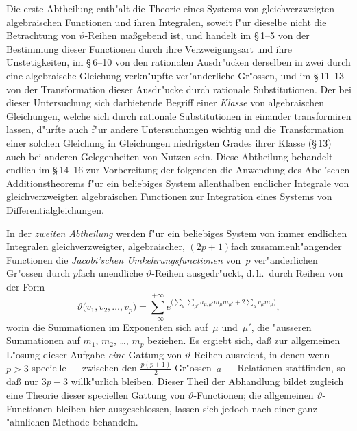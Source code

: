 \documentclass[12pt,a4paper]{book}
\theoremstyle{definition}
\theoremstyle{remark}
\begin{document}
Die erste Abtheilung enth"alt die Theorie eines Systems von
gleichverzweigten algebraischen Functionen und ihren Integralen, soweit
f"ur dieselbe nicht die Betrachtung von $\vartheta$-Reihen ma\ss{}gebend ist, und
handelt im \S\,1--5 von der Bestimmung dieser Functionen durch ihre
Verzweigungsart und ihre Unstetigkeiten, im \S\,6--10 von den rationalen
Ausdr"ucken derselben in zwei durch eine algebraische Gleichung verkn"upfte
ver"anderliche Gr"ossen, und im \S\,11--13 von der Transformation dieser
Ausdr"ucke durch rationale Substitutionen. Der bei dieser Untersuchung
sich darbietende Begriff einer \emph{Klasse} von algebraischen Gleichungen,
welche sich durch rationale Substitutionen in einander transformiren lassen,
d"urfte auch f"ur andere Untersuchungen wichtig und die Transformation
einer solchen Gleichung in Gleichungen niedrigsten Grades ihrer Klasse
(\S\,13) auch bei anderen Gelegenheiten von Nutzen sein. Diese Abtheilung
behandelt endlich im \S\,14--16 zur Vorbereitung der folgenden die
Anwendung des Abel'schen Additionstheorems f"ur ein beliebiges System
allenthalben endlicher Integrale von gleichverzweigten algebraischen
Functionen zur Integration eines Systems von Differentialgleichungen.

In der \emph{zweiten Abtheilung} werden f"ur ein beliebiges System von
immer endlichen Integralen gleichverzweigter, algebraischer, $(2p+1)$fach
zusammenh"angender Functionen die \emph{Jacobi'schen Umkehrungsfunctionen}
von~$p$ ver"anderlichen Gr"ossen durch $p$fach unendliche $\vartheta$-Reihen
ausgedr"uckt, d.\,h.\ durch Reihen von der Form
\[
\vartheta\bigl(v_1, v_2, \ldots, v_p\bigr) =
\sum_{-\infty}^{+\infty} e^{\bigl(\sum_{\mu} \sum_{\mu'}
  a_{\mu,\mu'} m_\mu m_{\mu'} + 2\sum_\mu v_\mu m_\mu\bigr)}\!,
\]
worin die Summationen im Exponenten sich auf~$\mu$ und~$\mu'$, die "ausseren
Summationen auf $m_1$, $m_2$, \ldots, $m_p$ beziehen. Es ergiebt sich, da\ss{}
zur allgemeinen L"osung dieser Aufgabe \emph{eine} Gattung von
$\vartheta$-Reihen ausreicht, in denen wenn $p > 3$ specielle --- zwischen
den $\frac{p(p+1)}{2}$ Gr"ossen~$a$ --- Relationen stattfinden, so da\ss{} nur
$3p - 3$ willk"urlich bleiben. Dieser Theil der Abhandlung bildet zugleich
eine Theorie dieser speciellen Gattung von $\vartheta$-Functionen; die allgemeinen
$\vartheta$-Functionen bleiben hier ausgeschlossen, lassen sich jedoch nach einer
ganz "ahnlichen Methode behandeln.
\end{document}
